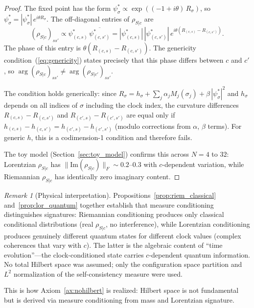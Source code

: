 \documentclass[12pt,a4paper]{article}
\theoremstyle{definition}
\theoremstyle{remark}
\newtheorem{remark}{Remark}
\begin{document}
\begin{proof}
The fixed point has the form $\psi^*_\sigma \propto \exp((-1 +
i\theta)\,R_\sigma)$, so $\psi^*_\sigma = |\psi^*_\sigma|\,
e^{i\theta R_\sigma}$. The off-diagonal entries of $\rho_{S|c}$ are
\[
(\rho_{S|c})_{ss'} \propto \psi^*_{(c,s)}\,\overline{\psi^*_{(c,s')}}
= |\psi^*_{(c,s)}|\,|\psi^*_{(c,s')}|\,
e^{i\theta(R_{(c,s)} - R_{(c,s')})}.
\]
The phase of this entry is $\theta(R_{(c,s)} - R_{(c,s')})$. The
genericity condition~(\ref{eq:genericity}) states precisely that this
phase differs between $c$ and $c'$, so
$\arg(\rho_{S|c})_{ss'} \neq \arg(\rho_{S|c'})_{ss'}$.

The condition holds generically: since $R_\sigma = h_\sigma + \sum_j
\alpha_j M_j(\sigma_j) + \beta\,|\psi^*_\sigma|^2$ and $h_\sigma$
depends on all indices of $\sigma$ including the clock index, the
curvature differences $R_{(c,s)} - R_{(c,s')}$ and $R_{(c',s)} -
R_{(c',s')}$ are equal only if $h_{(c,s)} - h_{(c,s')} = h_{(c',s)} -
h_{(c',s')}$ (modulo corrections from $\alpha$, $\beta$ terms). For
generic $h$, this is a codimension-1 condition and therefore fails.

The toy model (Section~\ref{sec:toy_model}) confirms this across
$N = 4$ to $32$: Lorentzian $\rho_{S|c}$ has
$\|\mathrm{Im}(\rho_{S|c})\|_F \sim 0.2$--$0.3$ with $c$-dependent
variation, while Riemannian $\rho_{S|c}$ has identically zero imaginary
content.
\end{proof}

\begin{remark}[Physical interpretation]
\label{rem:pw_lorentzian}
Propositions~\ref{prop:riem_classical} and~\ref{prop:lor_quantum}
together establish that measure conditioning distinguishes signatures:
Riemannian conditioning produces only classical conditional
distributions (real $\rho_{S|c}$, no interference), while Lorentzian
conditioning produces genuinely different quantum states for different
clock values (complex coherences that vary with $c$). The latter is the
algebraic content of ``time evolution''---the clock-conditioned state
carries $c$-dependent quantum information. No total Hilbert space was
assumed; only the configuration space partition and $L^2$ normalization
of the self-consistency measure were used.
\end{remark}

This is how Axiom~\ref{ax:nohilbert} is realized: Hilbert space is not
fundamental but is derived via measure conditioning from mass and
Lorentzian signature.

\end{document}
